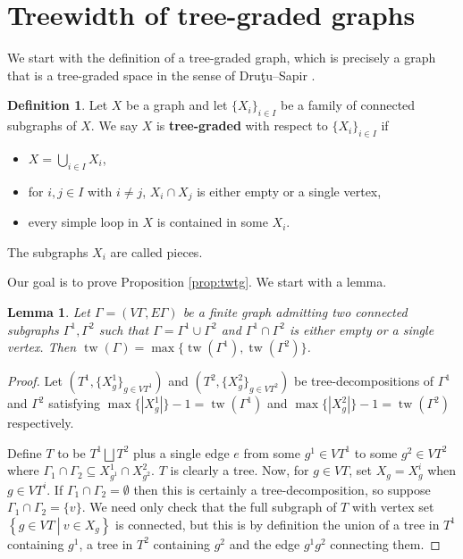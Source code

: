 \documentclass{article}
\numberwithin{equation}{section}
\newtheorem{lemma}[equation]{Lemma}
\theoremstyle{definition}
\newtheorem{definition}[equation]{Definition}
\theoremstyle{citing}
\DeclareMathOperator{\tw}{tw}
\newcommand{\setcon}[2]{\left\{#1\ \left|\ #2\right.\right\}}
\numberwithin{equation}{section}
\begin{document}
\section{Treewidth of tree-graded graphs}

We start with the definition of a tree-graded graph, which is precisely a graph that is a tree-graded space in the sense of Dru\c{t}u--Sapir \cite{DS05}.

\begin{definition}\label{defn:tg}
    Let $X$ be a graph and let $\{X_i\}_{i\in I}$ be a family of connected subgraphs of $X$. We say $X$ is \textbf{tree-graded} with respect to $\{X_i\}_{i\in I}$ if
    \begin{itemize}
        \item $X=\bigcup_{i\in I} X_i$,
        \item for $i,j\in I$ with $i\neq j$, $X_i\cap X_j$ is either empty or a single vertex,
        \item every simple loop in $X$ is contained in some $X_i$.
    \end{itemize}
    The subgraphs $X_i$ are called pieces.
\end{definition}

Our goal is to prove Proposition \ref{prop:twtg}. We start with a lemma.

\begin{lemma}\label{lem:twjoin}
    Let $\Gamma=(V\Gamma,E\Gamma)$ be a finite graph admitting two connected subgraphs $\Gamma^1,\Gamma^2$ such that $\Gamma=\Gamma^1\cup\Gamma^2$ and $\Gamma^1\cap \Gamma^2$ is either empty or a single vertex. Then $\tw(\Gamma)=\max\{\tw(\Gamma^1),\tw(\Gamma^2)\}$.
\end{lemma}
\begin{proof}
    Let $(T^1,\{X^1_g\}_{g\in VT^1})$ and $(T^2,\{X^2_g\}_{g\in VT^2})$ be tree-decompositions of $\Gamma^1$ and $\Gamma^2$ satisfying $\max\{|X^1_g|\}-1=\tw(\Gamma^1)$ and $\max\{|X^2_g|\}-1=\tw(\Gamma^2)$ respectively.

    Define $T$ to be $T^1\bigsqcup T^2$ plus a single edge $e$ from some $g^1\in VT^1$ to some $g^2\in VT^2$ where $\Gamma_1\cap\Gamma_2\subseteq X^1_{g^1}\cap X^2_{g^2}$. $T$ is clearly a tree. Now, for $g\in VT$, set $X_g=X^i_g$ when $g\in VT^i$. If $\Gamma_1\cap\Gamma_2=\emptyset$ then this is certainly a tree-decomposition, so suppose $\Gamma_1\cap\Gamma_2=\{v\}$. We need only check that the full subgraph of $T$ with vertex set $\setcon{g\in VT}{v\in X_g}$ is connected, but this is by definition the union of a tree in $T^1$ containing $g^1$, a tree in $T^2$ containing $g^2$ and the edge $g^1g^2$ connecting them.
\end{proof}
 
\end{document}
